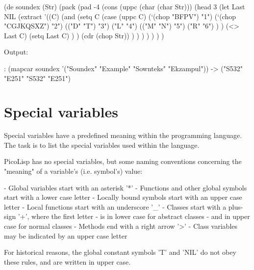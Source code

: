 \begin{wideverbatim}

(de soundex (Str)
   (pack
      (pad -4
         (cons
            (uppc (char (char Str)))
            (head 3
               (let Last NIL
                  (extract
                     '((C)
                        (and
                           (setq C
                              (case (uppc C)
                                 (`(chop "BFPV") "1")
                                 (`(chop "CGJKQSXZ") "2")
                                 (("D" "T") "3")
                                 ("L" "4")
                                 (("M" "N") "5")
                                 ("R" "6") ) )
                           (<> Last C)
                           (setq Last C) ) )
                     (cdr (chop Str)) ) ) ) ) ) ) )

Output:

: (mapcar soundex '("Soundex" "Example" "Sownteks" "Ekzampul"))
-> ("S532" "E251" "S532" "E251")

\end{wideverbatim}

\pagebreak{}
\section*{Special variables}

Special variables have a predefined meaning within the programming
language. The task is to list the special variables used within the
language.


\begin{wideverbatim}

PicoLisp has no special variables, but some naming conventions concerning
the "meaning" of a variable's (i.e. symbol's) value:

- Global variables start with an asterisk '*'
- Functions and other global symbols start with a lower case letter
- Locally bound symbols start with an upper case letter
- Local functions start with an underscore '_'
- Classes start with a plus-sign '+', where the first letter
   - is in lower case for abstract classes
   - and in upper case for normal classes
- Methods end with a right arrow '>'
- Class variables may be indicated by an upper case letter

For historical reasons, the global constant symbols 'T' and 'NIL' do not obey
these rules, and are written in upper case.

\end{wideverbatim}

